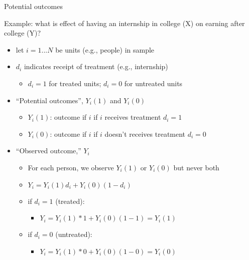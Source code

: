 \begin{frame}{Potential outcomes}

	Example: what is effect of having an internship in college (X) on earning after college (Y)?
	\begin{itemize}
		\item let $ i=1...N $ be units (e.g., people) in sample
		\item $ d_i $ indicates receipt of treatment (e.g., internship)
		\begin{itemize}
			\item $ d_i=1 $ for treated units; $ d_i=0 $ for untreated units
		\end{itemize}
		\item ``Potential outcomes'', $ Y_i(1) $ and $ Y_i(0) $
		\begin{itemize}
			\item $ Y_i(1) $: outcome if $ i $ if $ i $ receives treatment $ d_i=1 $
			\item $ Y_i(0) $: outcome if $ i $ if $ i $ doesn't receives treatment $ d_i=0 $
		\end{itemize}
		\item ``Observed outcome,'' $ Y_i $
		\begin{itemize}
			\item For each person, we observe $ Y_i(1) $ or $ Y_i(0)$ but never both
			\item $ Y_i=Y_i(1)d_i+Y_i(0)(1-d_i)$
			\item if $ d_i=1 $ (treated):
			\begin{itemize}
				\item  $Y_i=Y_i(1)*1+Y_i(0)(1-1)=Y_i(1)$
			\end{itemize}
			\item if $ d_i=0 $ (untreated): 
			\begin{itemize}
				\item $Y_i=Y_i(1)*0+Y_i(0)(1-0)=Y_i(0)$
			\end{itemize}

		\end{itemize}

	\end{itemize}

\end{frame}


